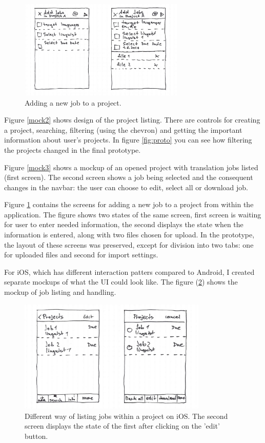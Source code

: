 \begin{figure}[H]
	\includegraphics[width=0.7\textwidth]{pics/addJobs}
	\caption{Adding a new job to a project.}
	\label{mock4}
\end{figure}


Figure \ref{mock2} shows design of the project listing. There are controls for creating a project, searching, filtering (using the chevron) and getting the important information about user's projects. In figure \ref{fig:proto} you can see how filtering the projects changed in the final prototype. 

Figure \ref{mock3} shows a mockup of an opened project with translation jobs listed (first screen). The second screen shows a job being selected and the consequent changes in the navbar: the user can choose to edit, select all or download job. 

Figure \ref{mock4} contains the screens for adding a new job to a project from within the application. The figure shows two states of the same screen, first screen is waiting for user to enter needed information, the second displays the state when the information is entered, along with two files chosen for upload. In the prototype, the layout of these screens was preserved, except for division into two tabs: one for uploaded files and second for import settings.



For iOS, which has different interaction patters compared to Android, I created separate mockups of what the UI could look like. The figure (\ref{mock5}) shows the mockup of job listing and handling.

\begin{figure}[]
	\includegraphics[width=0.8\textwidth]{pics/iosProjs2}
	\caption{Different way of listing jobs within a project on iOS. The second screen displays the state of the first after clicking on the 'edit' button.}
	\label{mock5}
\end{figure}



